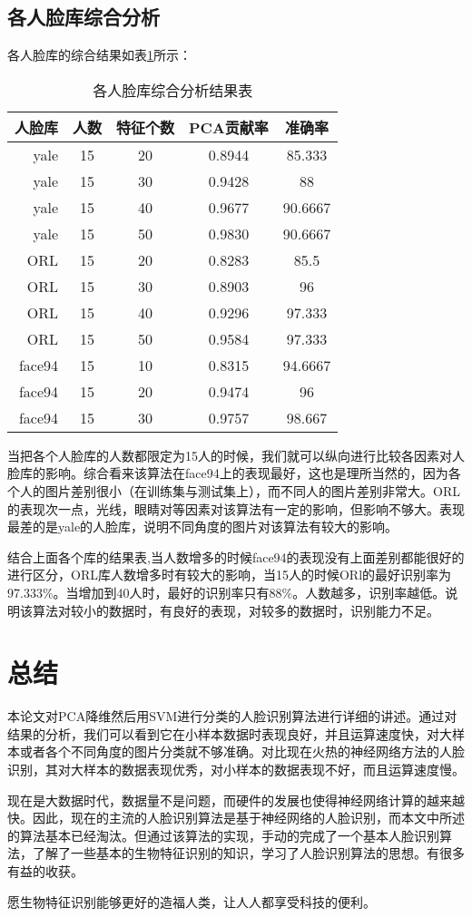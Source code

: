 \documentclass[a4paper,12pt]{ctexart}
\begin{document}
\subsection{各人脸库综合分析}

各人脸库的综合结果如表\ref{tab:zhonghe}所示：

\begin{table}[!htb]
  \centering
\begin{tabular}{|r|c|c|c|c|}
\hline
人脸库&人数&特征个数&PCA贡献率&准确率\\
\hline
yale&   15&     20&     0.8944& 85.333\\
yale&   15&     30&     0.9428& 88\\
yale&   15&     40&     0.9677& 90.6667\\
yale&   15&     50&     0.9830& 90.6667\\
\hline
ORL&    15&     20&     0.8283  &85.5\\
ORL&    15&     30&     0.8903  &96\\
ORL&    15&     40&     0.9296  &97.333\\
ORL&    15&     50&     0.9584  &97.333\\
\hline
face94& 15&     10&     0.8315& 94.6667\\
face94& 15&     20&     0.9474& 96\\
face94& 15&     30&     0.9757& 98.667\\
\hline
\end{tabular}
  \caption{各人脸库综合分析结果表}
  \label{tab:zhonghe}
\end{table}

当把各个人脸库的人数都限定为15人的时候，我们就可以纵向进行比较各因素对人脸库的影响。综合看来该算法在face94上的表现最好，这也是理所当然的，因为各个人的图片差别很小（在训练集与测试集上），而不同人的图片差别非常大。ORL的表现次一点，光线，眼睛对等因素对该算法有一定的影响，但影响不够大。表现最差的是yale的人脸库，说明不同角度的图片对该算法有较大的影响。

结合上面各个库的结果表,当人数增多的时候face94的表现没有上面差别都能很好的进行区分，ORL库人数增多时有较大的影响，当15人的时候ORl的最好识别率为97.333\%。当增加到40人时，最好的识别率只有88\%。人数越多，识别率越低。说明该算法对较小的数据时，有良好的表现，对较多的数据时，识别能力不足。

\section{总结}

本论文对PCA降维然后用SVM进行分类的人脸识别算法进行详细的讲述。通过对结果的分析，我们可以看到它在小样本数据时表现良好，并且运算速度快，对大样本或者各个不同角度的图片分类就不够准确。对比现在火热的神经网络方法的人脸识别，其对大样本的数据表现优秀，对小样本的数据表现不好，而且运算速度慢。

现在是大数据时代，数据量不是问题，而硬件的发展也使得神经网络计算的越来越快。因此，现在的主流的人脸识别算法是基于神经网络的人脸识别，而本文中所述的算法基本已经淘汰。但通过该算法的实现，手动的完成了一个基本人脸识别算法，了解了一些基本的生物特征识别的知识，学习了人脸识别算法的思想。有很多有益的收获。

愿生物特征识别能够更好的造福人类，让人人都享受科技的便利。
\end{document}
